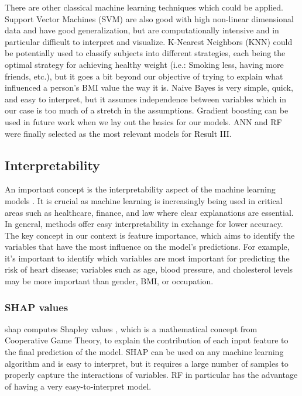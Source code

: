 There are other classical machine learning techniques which could be applied. Support Vector Machines (SVM) \cite{AlZaiti2022} are also good with high non-linear dimensional data and have good generalization, but are computationally intensive and in particular difficult to interpret and visualize. K-Nearest Neighbors (KNN) \cite{AlZaiti2022} could be potentially used to classify subjects into different strategies, each being the optimal strategy for achieving healthy weight (i.e.: Smoking less, having more friends, etc.), but it goes a bit beyond our objective of trying to explain what influenced a person's BMI value the way it is. Naive Bayes is very simple, quick, and  easy to interpret, but it assumes independence between variables which in our case is too much of a stretch in the assumptions. Gradient boosting can be used in future work when we lay out the basics for our models. ANN and RF were finally selected as the most relevant models for \colorbox{ResultColor}{\textcolor{black}{Result III}}.



\subsection{Interpretability}

An important concept is the interpretability aspect of the machine learning models \cite{Somani2023}. It is crucial as machine learning is increasingly being used in critical areas such as healthcare, finance, and law where clear explanations are essential.  In general, methods offer easy interpretability in exchange for lower accuracy. The key concept in our context is feature importance, which aims to identify the variables that have the most influence on the model's predictions. For example, it's important to identify which variables are most important for predicting the risk of heart disease; variables such as age, blood pressure, and cholesterol levels may be more important than gender, BMI, or occupation. 

\subsubsection{SHAP values}

\gls{shap} computes Shapley values \cite{NIPS2017_7062}, which is a mathematical concept from Cooperative Game Theory, to explain the contribution of each input feature to the final prediction of the model. SHAP can be used on any machine learning algorithm and is easy to interpret, but it requires a large number of samples to properly capture the interactions of variables. RF in particular has the advantage of having a very easy-to-interpret model.

